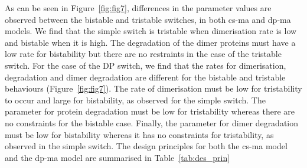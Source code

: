 As can be seen in Figure~\ref{fig:fig7}, differences in the parameter values are observed between the bistable and tristable switches, in both \acrshort{cs-ma} and \acrshort{dp-ma} models. We find that the simple switch is tristable when dimerisation rate is low and bistable when it is high. The degradation of the dimer proteins must have a low rate for bistability but there are no restraints in the case of the tristable switch. For the case of the DP switch, we find that the rates for dimerisation, degradation and dimer degradation are different for the bistable and tristable behaviours (Figure~\ref{fig:fig7}). The rate of dimerisation must be low for tristability to occur and large for bistability, as observed for the simple switch. The parameter for protein degradation must be low for tristability whereas there are no constraints for the bistable case. Finally, the parameter for dimer degradation must be low for bistability whereas it has no constraints for tristability, as observed in the simple switch. The design principles for both the \acrshort{cs-ma} model and the \acrshort{dp-ma} model are summarised in Table~\ref{tab:des_prin}



